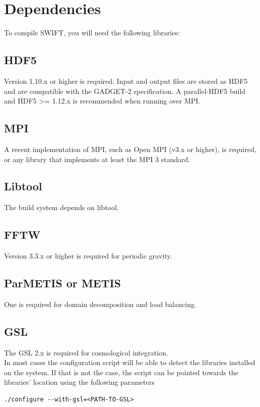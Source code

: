 \section{Dependencies}

To compile SWIFT, you will need the following libraries:


\subsection{HDF5}

Version 1.10.x or higher is required. Input and output files are stored as HDF5
and are compatible with the GADGET-2 specification. A parallel-HDF5 build
and HDF5 >= 1.12.x is recommended when running over MPI.


\subsection{MPI}
A recent implementation of MPI, such as Open MPI (v3.x or higher), is required,
or any library that implements at least the MPI 3 standard.


\subsection{Libtool}
The build system depends on libtool.


\subsection{FFTW}
Version 3.3.x or higher is required for periodic gravity.


\subsection{ParMETIS or METIS}
One is required for domain decomposition and load balancing.


\subsection{GSL}
The GSL 2.x is required for cosmological integration.\\

In most cases the configuration script will be able to detect the libraries
installed on the system. If that is not the case, the script can be pointed
towards the libraries' location using the following parameters

\begin{lstlisting}[style=codeblock]
./configure --with-gsl=<PATH-TO-GSL>
\end{lstlisting}

